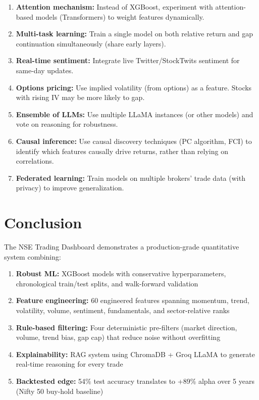 \documentclass[11pt,a4paper]{article}
\begin{document}
\begin{enumerate}
    \item \textbf{Attention mechanism:} Instead of XGBoost, experiment with attention-based models (Transformers) to weight features dynamically.

    \item \textbf{Multi-task learning:} Train a single model on both relative return and gap continuation simultaneously (share early layers).

    \item \textbf{Real-time sentiment:} Integrate live Twitter/StockTwits sentiment for same-day updates.

    \item \textbf{Options pricing:} Use implied volatility (from options) as a feature. Stocks with rising IV may be more likely to gap.

    \item \textbf{Ensemble of LLMs:} Use multiple LLaMA instances (or other models) and vote on reasoning for robustness.

    \item \textbf{Causal inference:} Use causal discovery techniques (PC algorithm, FCI) to identify which features causally drive returns, rather than relying on correlations.

    \item \textbf{Federated learning:} Train models on multiple brokers' trade data (with privacy) to improve generalization.
\end{enumerate}

\section{Conclusion}

The NSE Trading Dashboard demonstrates a production-grade quantitative system combining:

\begin{enumerate}
    \item \textbf{Robust ML:} XGBoost models with conservative hyperparameters, chronological train/test splits, and walk-forward validation
    \item \textbf{Feature engineering:} 60 engineered features spanning momentum, trend, volatility, volume, sentiment, fundamentals, and sector-relative ranks
    \item \textbf{Rule-based filtering:} Four deterministic pre-filters (market direction, volume, trend bias, gap cap) that reduce noise without overfitting
    \item \textbf{Explainability:} RAG system using ChromaDB + Groq LLaMA to generate real-time reasoning for every trade
    \item \textbf{Backtested edge:} 54\% test accuracy translates to +89\% alpha over 5 years (Nifty 50 buy-hold baseline)
\end{enumerate}
\end{document}
